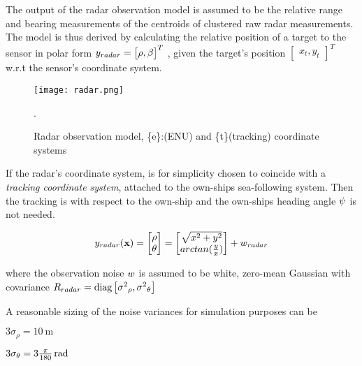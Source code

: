 The output of the radar observation model is assumed to be the relative range and bearing measurements of the centroids of clustered raw radar measurements. The model is thus derived by calculating the relative position of a target to the sensor in polar form ${{y}}_{radar} = \begin{bmatrix}
{\rho},
{\beta}
\end{bmatrix}^{T}$ , given the target's position $\begin{bmatrix}x_t, y_t\end{bmatrix}^{T}$ w.r.t the sensor's coordinate system.


\begin{figure}[H]
	\centering
	\texttt{[image: radar.png]}
	\caption{Radar observation model, \{e\}:(ENU) and \{t\}(tracking) coordinate systems}.
	\label{fig:radar_observation_model}
\end{figure}


If the radar's coordinate system, is for simplicity  chosen to coincide with a \emph{tracking coordinate system},  attached to the own-ships sea-following system. Then the tracking is with respect to the own-ship and the own-ships heading angle ${\psi}$ is not needed.

\begin{equation}
{{y}}_{radar}(\mathbf{x}) = \begin{bmatrix}
\rho \\
\theta
\end{bmatrix} = \begin{bmatrix}
\sqrt{x^2 + y^2} \\
arctan(\frac{y}{x})
\end{bmatrix} + {w}_{radar}
\end{equation}


where the observation noise ${w}$ is assumed to be white, zero-mean Gaussian with covariance ${R}_{radar} = \text{diag}\left[{\sigma^2}_{\rho}, {\sigma^2}_{\theta}\right] $



A reasonable sizing of the noise variances for simulation purposes can be
\begin{description}
	\item $3\sigma_\rho = \SI{10}{\meter}$
	\item $3\sigma_\theta = \SI[parse-numbers=false]{3\frac{\pi}{180}}{\radian}  $
\end{description}

